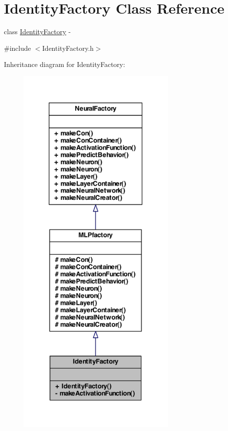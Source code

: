 \hypertarget{class_identity_factory}{
\section{IdentityFactory Class Reference}
\label{class_identity_factory}
}


class \hyperlink{class_identity_factory}{IdentityFactory} -\/  




{\ttfamily \#include $<$IdentityFactory.h$>$}



Inheritance diagram for IdentityFactory:
\nopagebreak
\begin{figure}[H]
\begin{center}
\leavevmode
\includegraphics[width=222pt]{class_identity_factory__inherit__graph}
\end{center}
\end{figure}


